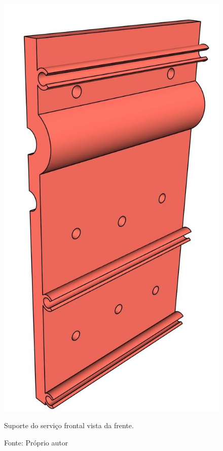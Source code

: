 \begin{figure}[H]
\centering
\includegraphics[scale = 0.4]{figuras/ressuporteservicofrontalf}
\caption{Suporte do serviço frontal vista da frente.}
\caption*{Fonte: Próprio autor}
\label{fig:ressuporteservicofrontalf}
\end{figure}

